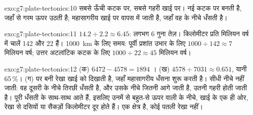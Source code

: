 \begin{solution}{exo:g7:plate-tectonics:10}
सबसे ऊँची कटक पर, सबसे गहरी खाई पर। नई  कटक पर बनती है, जहाँ  से
गरम  ऊपर उठती है; महासागरीय  खाई पर वापस  में जाती है, जहाँ
वह  के नीचे धँसती है।
\end{solution}

\begin{solution}{exo:g7:plate-tectonics:11}
$14.2 \div 2.2 \approx 6.45$: लगभग 6 गुना तेज़।
किलोमीटर प्रति मिलियन वर्ष में चालें 142 और 22 हैं।
\qty{1000}{km} के लिए समय: पूर्वी प्रशांत उभार के लिए $1000 \div 142 \approx 7$
मिलियन वर्ष; उत्तर अटलांटिक कटक के लिए $1000 \div 22 \approx 45$ मिलियन
वर्ष।
\end{solution}

\begin{solution}{exo:g7:plate-tectonics:12}
(क) $6472 - 4578 = 1894$ । (ख) $4578 \div 7031 \approx 0.651$,
यानी 65\,\%। (ग)  पर बनी रेखा खाई को दिखाती है, जहाँ महासागरीय 
धँसना शुरू करती है।  सीधी नीचे नहीं जाती: वह दूसरी  के नीचे तिरछी
धँसती है, और उसके नीचे जितनी आगे जाती है, उतनी गहरी होती जाती है।  पूरी
धँसती  के साथ-साथ आते हैं, इसलिए उनमें से बहुत-से ऊपर वाली  के नीचे,
खाई के एक ही ओर, रेखा से दसियों या सैकड़ों किलोमीटर दूर होते हैं। 
एक क्षेत्र है, कोई पतली रेखा नहीं।
\end{solution}

